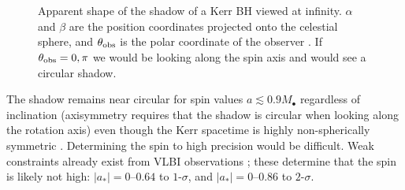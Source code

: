 \begin{figure}%
  \begin{center}
    \quad
    \quad
    \\
    \quad
    \quad
    \\
    \quad  
    \caption{Apparent shape of the shadow of a Kerr BH viewed at infinity. $\alpha$ and $\beta$ are the position coordinates projected onto the celestial sphere, and $\theta_\mathrm{obs}$ is the polar coordinate of the observer \citep[section 63]{Chandrasekhar1992}. If $\theta_\mathrm{obs} = 0, \pi$ we would be looking along the spin axis and would see a circular shadow.} 
    \label{fig:Shadow}
  \end{center}
\end{figure}
The shadow remains near circular for spin values $a \lesssim 0.9 M_\bullet$ regardless of inclination (axisymmetry requires that the shadow is circular when looking along the rotation axis) even though the Kerr spacetime is highly non-spherically symmetric \citep{Johannsen2010b}. Determining the spin to high precision would be difficult. Weak constraints already exist from VLBI observations \citep{Broderick2009a,Broderick2011}; these determine that the spin is likely not high: $|a_\ast| = 0$--$0.64$ to $1$-$\sigma$, and $|a_\ast| = 0$--$0.86$ to $2$-$\sigma$.

